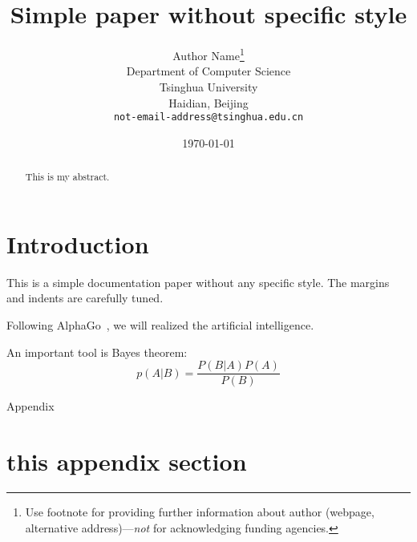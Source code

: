 \documentclass[11pt]{article}
\begin{document}
\title{Simple paper without specific style}
\author{Author Name\thanks{Use footnote for providing further information
    about author (webpage, alternative address)---\emph{not} for acknowledging
    funding agencies.} \\
  Department of Computer Science\\
  Tsinghua University\\
  Haidian, Beijing \\
  \texttt{not-email-address@tsinghua.edu.cn} \\
}
\date{\today}
\maketitle
%



\begin{abstract}
This is my abstract.
\end{abstract}


\section{Introduction}
This is a simple documentation paper without any specific style. The margins and indents are carefully tuned. 

Following AlphaGo~\cite{silver2016mastering}, we will realized the artificial intelligence.

An important tool is Bayes theorem:
\begin{equation}
    p(A|B) = \frac{P(B|A)P(A)}{P(B)}
\end{equation}





\clearpage
{\centering \huge Appendix}
\appendix
\section{this appendix section}
\end{document}
